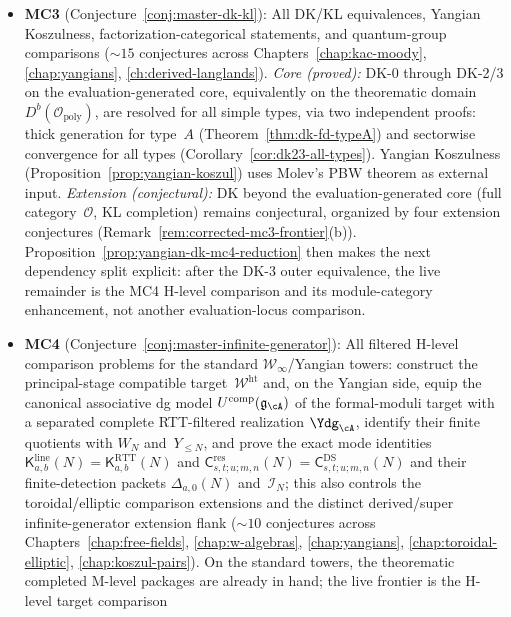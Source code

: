 \begin{remark}
\begin{itemize}
\item \textbf{MC3} (Conjecture~\ref{conj:master-dk-kl}):
  All DK/KL equivalences, Yangian Koszulness, factorization-categorical
  statements, and quantum-group comparisons (${\sim}15$ conjectures
  across Chapters~\ref{chap:kac-moody}, \ref{chap:yangians},
  \ref{ch:derived-langlands}).
  \emph{Core (proved):} DK-0 through DK-2/3 on the
  evaluation-generated core, equivalently on the theorematic domain
  $D^b(\mathcal{O}_{\mathrm{poly}})$, are resolved for all simple
  types, via two independent proofs: thick generation for
  type~$A$ (Theorem~\ref{thm:dk-fd-typeA}) and sectorwise
  convergence for all types
  (Corollary~\ref{cor:dk23-all-types}).
  Yangian Koszulness (Proposition~\ref{prop:yangian-koszul})
  uses Molev's PBW theorem \cite{molev-yangians} as external input.
  \emph{Extension (conjectural):} DK beyond the evaluation-generated
  core (full category~$\mathcal{O}$, KL completion) remains conjectural,
  organized by four extension conjectures
  (Remark~\ref{rem:corrected-mc3-frontier}(b)).
  Proposition~\ref{prop:yangian-dk-mc4-reduction}
  then makes the next dependency split explicit: after the DK-3 outer
  equivalence, the live remainder is the MC4 H-level comparison and its
  module-category enhancement, not another evaluation-locus
  comparison.
\item \textbf{MC4} (Conjecture~\ref{conj:master-infinite-generator}):
  All filtered H-level comparison problems for the standard
  $\mathcal{W}_\infty$/Yangian towers: construct the principal-stage
  compatible target~$\mathcal{W}^{\mathrm{ht}}$ and, on the Yangian
  side, equip the canonical associative dg model
  $U^{\mathrm{comp}}(\mathfrak{g}_{\cA})$ of the formal-moduli target
  with a separated complete RTT-filtered realization
  $\Ydg_{\cA}$, identify their finite quotients with $W_N$
  and~$Y_{\le N}$, and prove the exact mode
  identities
  $\mathsf{K}^{\mathrm{line}}_{a,b}(N)
  =\mathsf{K}^{\mathrm{RTT}}_{a,b}(N)$ and
  $\mathsf{C}^{\mathrm{res}}_{s,t;u;m,n}(N)
  =\mathsf{C}^{\mathrm{DS}}_{s,t;u;m,n}(N)$
  and their finite-detection packets
  $\Delta_{a,0}(N)$ and~$\mathcal{I}_N$; this also controls the
  toroidal/elliptic comparison extensions and the distinct
  derived/super infinite-generator extension flank
  (${\sim}10$ conjectures across Chapters~\ref{chap:free-fields},
  \ref{chap:w-algebras}, \ref{chap:yangians},
  \ref{chap:toroidal-elliptic}, \ref{chap:koszul-pairs}).  On the
  standard towers, the theorematic completed M-level packages are
  already in hand; the live frontier is the H-level target comparison

\end{itemize}
\end{remark}
